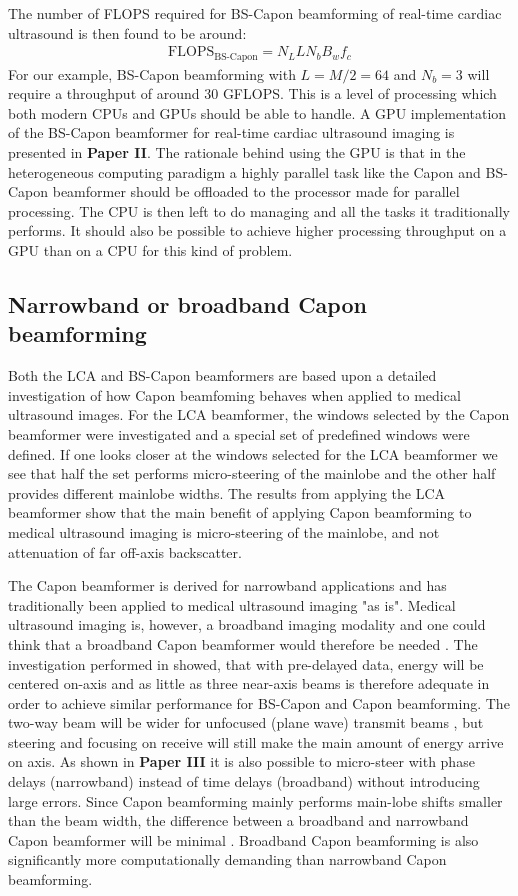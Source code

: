 The number of FLOPS required for BS-Capon beamforming of real-time cardiac ultrasound is then found to be around:
\begin{align}
\text{FLOPS}_{\text{BS-Capon}} = N_LLN_bB_wf_c
\end{align}
For our example, BS-Capon beamforming with $L=M/2=64$ and $N_b=3$ will require a throughput of around $30$ GFLOPS. This is a level of processing which both modern CPUs and GPUs should be able to handle. A GPU implementation of the BS-Capon beamformer for real-time cardiac ultrasound imaging is presented in \textbf{Paper II}. The rationale behind using the GPU is that in the heterogeneous computing paradigm a highly parallel task like the Capon and BS-Capon beamformer should be offloaded to the processor made for parallel processing. The CPU is then left to do managing and all the tasks it traditionally performs. It should also be possible to achieve higher processing throughput on a GPU than on a CPU for this kind of problem.

\subsection{Narrowband or broadband Capon beamforming}
Both the LCA and BS-Capon beamformers are based upon a detailed investigation of how Capon beamfoming behaves when applied to medical ultrasound images. For the LCA beamformer, the windows selected by the Capon beamformer were investigated and a special set of predefined windows were defined. If one looks closer at the windows selected for the LCA beamformer we see that half the set performs micro-steering of the mainlobe and the other half provides different mainlobe widths. The results from applying the LCA beamformer show that the main benefit of applying Capon beamforming to medical ultrasound imaging is micro-steering of the mainlobe, and not attenuation of far off-axis backscatter.

The Capon beamformer is derived for narrowband applications and has traditionally been applied to medical ultrasound imaging "as is". Medical ultrasound imaging is, however, a broadband imaging modality and one could think that a broadband Capon beamformer would therefore be needed \cite{Holfort2009}. The investigation performed in \cite{Nilsen2009} showed, that with pre-delayed data, energy will be centered on-axis and as little as three near-axis beams is therefore adequate in order to achieve similar performance for BS-Capon and Capon beamforming. The two-way beam will be wider for unfocused (plane wave) transmit beams \cite{Holfort2009, Austeng2011}, but steering and focusing on receive will still make the main amount of energy arrive on axis. As shown in \textbf{Paper III} it is also possible to micro-steer with phase delays (narrowband) instead of time delays (broadband) without introducing large errors. Since Capon beamforming mainly performs main-lobe shifts smaller than the beam width, the difference between a broadband and narrowband Capon beamformer will be minimal \cite{Diamantis2014}. Broadband Capon beamforming is also significantly more computationally demanding than narrowband Capon beamforming.

